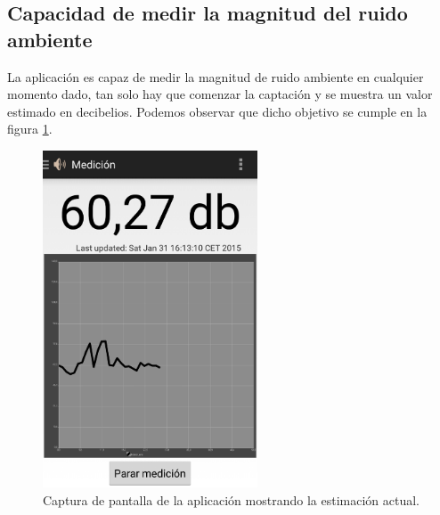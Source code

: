 \subsection{Capacidad de medir la magnitud del ruido ambiente}
La aplicación es capaz de medir la magnitud de ruido ambiente en cualquier momento dado, tan solo hay que comenzar la captación y se muestra un valor estimado en decibelios. Podemos observar que dicho objetivo se cumple en la figura \ref{fig:screen:measure}.
\begin{figure}[h] \centering
    \includegraphics[height=10cm]{graphs/screen_measure.png} \caption{Captura de pantalla de la aplicación mostrando la estimación actual.}\label{fig:screen:measure}
\end{figure}

